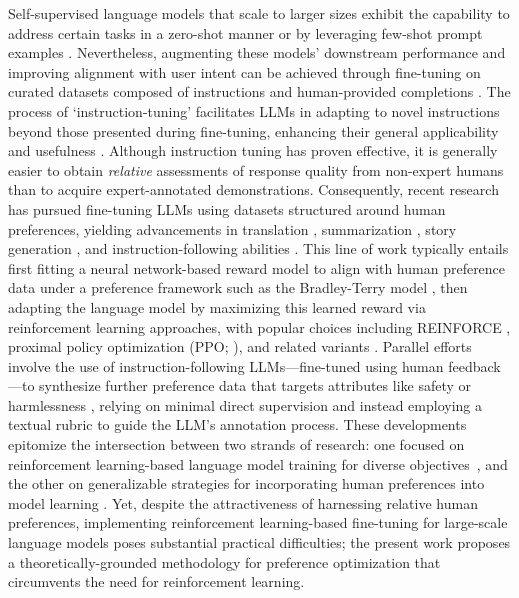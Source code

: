 Self-supervised language models that scale to larger sizes exhibit the capability to address certain tasks in a zero-shot manner \citep{radford2019language} or by leveraging few-shot prompt examples \citep{gpt3,megatron,chowdhery2022palm}. Nevertheless, augmenting these models’ downstream performance and improving alignment with user intent can be achieved through fine-tuning on curated datasets composed of instructions and human-provided completions \citep{mishra-etal-2022-cross,sanh2022multitask,chung2022scaling,thoppilan2022lamda}. The process of `instruction-tuning' facilitates LLMs in adapting to novel instructions beyond those presented during fine-tuning, enhancing their general applicability and usefulness \citep{chung2022scaling}. Although instruction tuning has proven effective, it is generally easier to obtain \textit{relative} assessments of response quality from non-expert humans than to acquire expert-annotated demonstrations. Consequently, recent research has pursued fine-tuning LLMs using datasets structured around human preferences, yielding advancements in translation \citep{kreutzer-etal-2018-reliability}, summarization \citep{stiennon2022learning,ziegler2020finetuning}, story generation \citep{ziegler2020finetuning}, and instruction-following abilities \citep{ouyang2022training,ramamurthy2023is}. This line of work typically entails first fitting a neural network-based reward model to align with human preference data under a preference framework such as the Bradley-Terry model \citep{bradley1952rankanalysis}, then adapting the language model by maximizing this learned reward via reinforcement learning approaches, with popular choices including REINFORCE \citep{williams1992reinforce}, proximal policy optimization (PPO; \cite{schulman2017proximal}), and related variants \citep{ramamurthy2023is}. Parallel efforts involve the use of instruction-following LLMs—fine-tuned using human feedback—to synthesize further preference data that targets attributes like safety or harmlessness \citep{bai2022constitutional}, relying on minimal direct supervision and instead employing a textual rubric to guide the LLM’s annotation process. These developments epitomize the intersection between two strands of research: one focused on reinforcement learning-based language model training for diverse objectives~\citep{Ranzato2015SequenceLT,paulus2018a,wu2018learning}, and the other on generalizable strategies for incorporating human preferences into model learning \citep{christiano2017deep,kupcsik2018learning}. Yet, despite the attractiveness of harnessing relative human preferences, implementing reinforcement learning-based fine-tuning for large-scale language models poses substantial practical difficulties; the present work proposes a theoretically-grounded methodology for preference optimization that circumvents the need for reinforcement learning.

